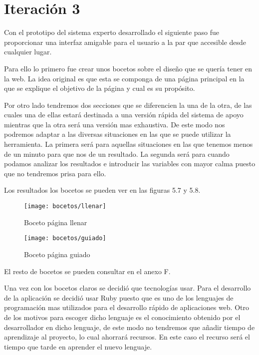 \section{Iteración 3}


Con el prototipo del sistema experto desarrollado el siguiente paso fue
proporcionar una interfaz amigable para el usuario a la par que accesible
desde cualquier lugar.

Para ello lo primero fue crear unos bocetos sobre el diseño que se quería tener
en la web. La idea original es que esta se componga de una página
principal en la que se explique el objetivo de la página y cual es su propósito.

Por otro lado tendremos dos secciones que se diferencien la una de la otra, de las
cuales una de ellas estará destinada a una versión rápida del sistema de apoyo mientras
que la otra será una versión mas exhaustiva. De este modo nos podremos adaptar
a las diversas situaciones en las que se puede utilizar la herramienta.
La primera será para aquellas situaciones en las que tenemos menos de un minuto
para que nos de un resultado. La segunda será para cuando podamos analizar
los resultados e introducir las variables con mayor calma puesto que no
tendremos prisa para ello.

Los resultados los bocetos se pueden ver en las figuras 5.7 y 5.8.

\begin{figure}[htb]
  \centering
    \texttt{[image: bocetos/llenar]}
  \caption[Boceto página llenar]{Boceto página llenar}
  \label{fig:Boceto página llenar}
\end{figure}

\begin{figure}[htb]
  \centering
    \texttt{[image: bocetos/guiado]}
  \caption[Boceto página guiado]{Boceto página guiado}
  \label{fig:Boceto página guiado}
\end{figure}

El resto de bocetos se pueden consultar en el anexo F.

Una vez con los bocetos claros se decidió que tecnologías usar. Para el desarrollo
de la aplicación se decidió usar Ruby puesto que es uno de los lenguajes
de programación mas utilizados para el desarrollo rápido de aplicaciones web.
Otro de los motivos para escoger dicho lenguaje es el conocimiento obtenido
por el desarrollador en dicho lenguaje, de este modo no tendremos que añadir
tiempo de aprendizaje al proyecto, lo cual ahorrará recursos. En este caso el
recurso será el tiempo que tarde en aprender el nuevo lenguaje.

